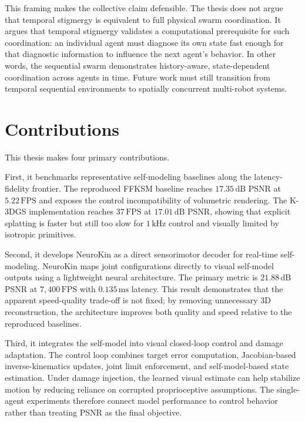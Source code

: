 \documentclass[12pt,a4paper,oneside]{report}
\begin{document}
This framing makes the collective claim defensible. The thesis does not argue that temporal stigmergy is equivalent to full physical swarm coordination. It argues that temporal stigmergy validates a computational prerequisite for such coordination: an individual agent must diagnose its own state fast enough for that diagnostic information to influence the next agent's behavior. In other words, the sequential swarm demonstrates history-aware, state-dependent coordination across agents in time. Future work must still transition from temporal sequential environments to spatially concurrent multi-robot systems.

\section{Contributions}

This thesis makes four primary contributions.

First, it benchmarks representative self-modeling baselines along the latency-fidelity frontier. The reproduced FFKSM baseline reaches $17.35\,\mathrm{dB}$ PSNR at $5.22\,\mathrm{FPS}$ and exposes the control incompatibility of volumetric rendering. The K-3DGS implementation reaches $37\,\mathrm{FPS}$ at $17.01\,\mathrm{dB}$ PSNR, showing that explicit splatting is faster but still too slow for $1\,\mathrm{kHz}$ control and visually limited by isotropic primitives.

Second, it develops NeuroKin as a direct sensorimotor decoder for real-time self-modeling. NeuroKin maps joint configurations directly to visual self-model outputs using a lightweight neural architecture. The primary metric is $21.88\,\mathrm{dB}$ PSNR at $7{,}400\,\mathrm{FPS}$ with $0.135\,\mathrm{ms}$ latency. This result demonstrates that the apparent speed-quality trade-off is not fixed; by removing unnecessary 3D reconstruction, the architecture improves both quality and speed relative to the reproduced baselines.

Third, it integrates the self-model into visual closed-loop control and damage adaptation. The control loop combines target error computation, Jacobian-based inverse-kinematics updates, joint limit enforcement, and self-model-based state estimation. Under damage injection, the learned visual estimate can help stabilize motion by reducing reliance on corrupted proprioceptive assumptions. The single-agent experiments therefore connect model performance to control behavior rather than treating PSNR as the final objective.
\end{document}
